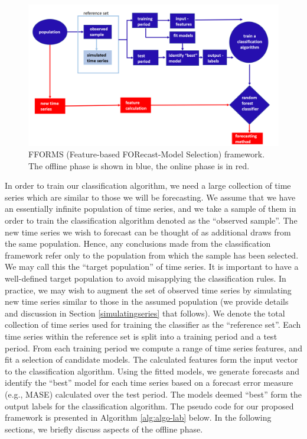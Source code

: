 \documentclass[11pt,a4paper,]{article}
\begin{document}
\begin{figure}

{\centering \includegraphics[width=1.1\linewidth]{images/framework} 

}

\caption{FFORMS (Feature-based FORecast-Model Selection) framework. The offline phase is shown in blue, the online phase is in red.}\label{fig:framework}
\end{figure}

In order to train our classification algorithm, we need a large collection of time series which are similar to those we will be forecasting. We assume that we have an essentially infinite population of time series, and we take a sample of them in order to train the classification algorithm denoted as the ``observed sample''. The new time series we wish to forecast can be thought of as additional draws from the same population. Hence, any conclusions made from the classification framework refer only to the population from which the sample has been selected. We may call this the ``target population'' of time series. It is important to have a well-defined target population to avoid misapplying the classification rules. In practice, we may wish to augment the set of observed time series by simulating new time series similar to those in the assumed population (we provide details and discussion in Section \ref{simulatingseries} that follows). We denote the total collection of time series used for training the classifier as the ``reference set''.
Each time series within the reference set is split into a training period and a test period. From each training period we compute a range of time series features, and fit a selection of candidate models. The calculated features form the input vector to the classification algorithm. Using the fitted models, we generate forecasts and identify the ``best'' model for each time series based on a forecast error measure (e.g., MASE) calculated over the test period. The models deemed ``best'' form the output labels for the classification algorithm. The pseudo code for our proposed framework is presented in Algorithm \ref{alg:algo-lab} below. In the following sections, we briefly discuss aspects of the offline phase.
\end{document}
